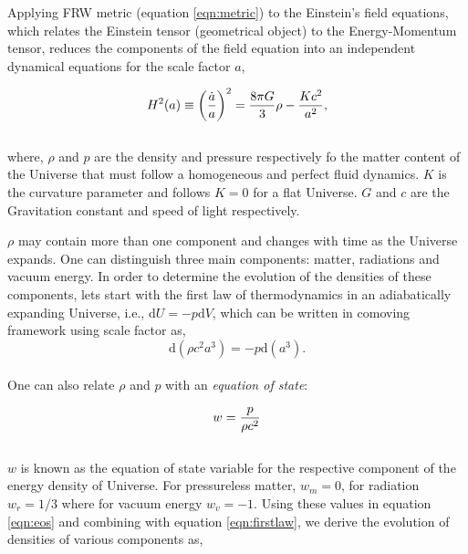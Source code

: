 
Applying FRW metric (equation \ref{eqn:metric}) to the Einstein's field equations, 
which relates the Einstein tensor (geometrical object) to the Energy-Momentum tensor, 
reduces the components of the field equation into an independent dynamical equations
for the scale factor $a$,

\begin{equation}
\centering
H^2(a) \equiv \left( \dfrac{\dot{a}}{a} \right)^2 = 
			\dfrac{8 \pi G}{3} \rho - \dfrac{Kc^2}{a^2},
\label{eqn:fe1}
\end{equation}
\\
where, $\rho$ and $p$ are the density and pressure respectively fo the matter content
of the Universe that must follow a homogeneous and perfect fluid dynamics. 
$K$ is the curvature parameter and follows $K=0$ for a flat Universe. $G$ and $c$ are
the Gravitation constant and speed of light respectively. 

$\rho$ may contain more than one component and changes with time as the Universe 
expands. One can distinguish three main components: matter, radiations and vacuum 
energy. In order to determine the evolution of the densities of these components,
lets start with the first law of thermodynamics in an adiabatically expanding Universe,
i.e., $\mathrm{d}U = -p\mathrm{d}V$, which can be written in comoving framework
using scale factor as,
\begin{equation}
	\mathrm{d}(\rho c^2 a^3) = -p \mathrm{d} (a^3).
	\label{eqn:firstlaw}
\end{equation}
\\
One can also relate $\rho$ and $p$ with an {\it equation of state}:

\begin{equation}
\centering
w = \dfrac{p}{\rho c^2}
\label{eqn:eos}
\end{equation}
\\
$w$ is known as the equation of state variable for the respective component
of the energy density of Universe. For pressureless matter, $w_m=0$,
for radiation $w_r=1/3$ where for vacuum energy $w_v=-1$. Using these values 
in equation \ref{eqn:eos} and combining with equation \ref{eqn:firstlaw}, we 
derive the evolution of densities of various components as,

